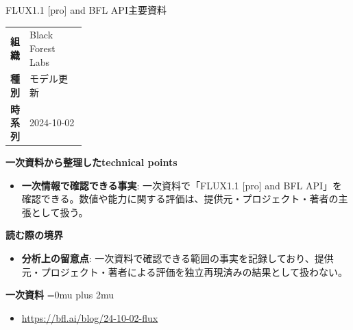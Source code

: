 \begin{technicalnote}{FLUX1.1 [pro] and BFL API}{主要資料}
\begingroup
\begin{tabularx}{\linewidth}{@{}>{\bfseries}p{0.22\linewidth}X@{}}
組織 & Black Forest Labs \\
種別 & モデル更新 \\
時系列 & 2024-10-02 \\
\end{tabularx}
\smallskip
{\bfseries 一次資料から整理したtechnical points}
\begin{itemize}[leftmargin=1.5em,itemsep=0.35em]
\item \textbf{一次情報で確認できる事実}: 一次資料で「FLUX1.1 [pro] and BFL API」を確認できる。数値や能力に関する評価は、提供元・プロジェクト・著者の主張として扱う。
\end{itemize}
\begin{minipage}{\linewidth}
{\bfseries 読む際の境界}
\begin{itemize}[leftmargin=1.5em,itemsep=0.35em]
\item \textbf{分析上の留意点}: 一次資料で確認できる範囲の事実を記録しており、提供元・プロジェクト・著者による評価を独立再現済みの結果として扱わない。
\end{itemize}
\begin{samepage}
{\bfseries 一次資料}
\begingroup\sloppy
\Urlmuskip=0mu plus 2mu\relax
\begin{itemize}[leftmargin=1.5em,itemsep=0.25em]
\item {\scriptsize\url{https://bfl.ai/blog/24-10-02-flux}}
\end{itemize}
\endgroup
\end{samepage}
\end{minipage}
\endgroup
\end{technicalnote}
\medskip


